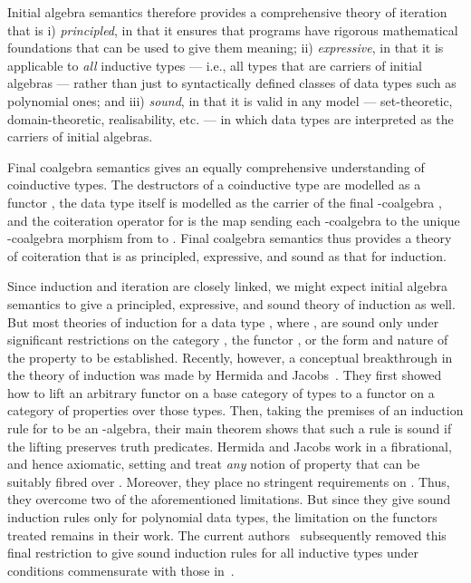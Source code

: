 \documentclass{LMCS}
\theoremstyle{plain}
\theoremstyle{remark}
\theoremstyle{definition}
\begin{document}
Initial algebra semantics therefore provides a comprehensive theory of
iteration that is i) {\em principled}, in that it ensures that
programs have rigorous mathematical foundations that can be used to
give them meaning; ii) {\em expressive}, in that it is applicable to
{\em all} inductive types --- i.e., all types that are carriers of
initial algebras --- rather than just to syntactically defined classes
of data types such as polynomial ones; and iii) {\em sound}, in that
it is valid in any model --- set-theoretic, domain-theoretic,
realisability, etc. --- in which data types are interpreted as the
carriers of initial algebras.

Final coalgebra semantics gives an equally comprehensive understanding
of coinductive types. The destructors of a coinductive type are
modelled as a functor , the data type itself is modelled as the
carrier  of the final -coalgebra , and the coiteration operator  for  is the map sending each -coalgebra
 to the unique -coalgebra morphism from  to
.  Final coalgebra semantics thus provides a theory of
coiteration that is as principled, expressive, and sound as that for
induction.

Since induction and iteration are closely linked, we might expect
initial algebra semantics to give a principled, expressive, and sound
theory of induction as well. But most theories of induction for a data
type , where , are sound only under significant
restrictions on the category , the functor , or the form and
nature of the property to be established. Recently, however, a
conceptual breakthrough in the theory of induction was made by Hermida
and Jacobs~\cite{hj98}. They first showed how to lift an arbitrary
functor  on a base category  of types to a functor  on
a category of properties over those types. Then, taking the premises
of an induction rule for  to be an -algebra, their
main theorem shows that such a rule is sound if the lifting 
preserves truth predicates. Hermida and Jacobs work in a fibrational,
and hence axiomatic, setting and treat {\em any} notion of property
that can be suitably fibred over . Moreover, they place no
stringent requirements on . Thus, they overcome two of the
aforementioned limitations. But since they give sound induction rules
only for polynomial data types, the limitation on the functors treated
remains in their work. The current authors~\cite{gjf10} subsequently
removed this final restriction to give sound induction rules for all
inductive types under conditions commensurate with those
in~\cite{hj98}.
\end{document}
